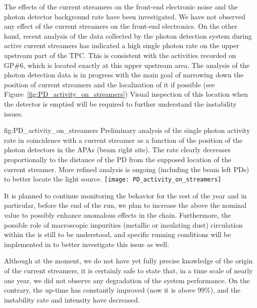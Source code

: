The effects of the current streamers on the front-end electronic noise and the photon detector background rate have been investigated. We have not observed any effect of the current streamers on the front-end electronics. On the other hand, recent analysis of the data collected by the photon detection system during active current streamers has indicated a high single photon rate on the upper upstream part of the TPC. This is consistent with the activities recorded on GP\#6, which is located exactly at this upper upstream area. The analysis of the photon detection data is in progress with the main goal of narrowing down the position of current streamers and the localization of it if possible (see Figure~\ref{fig:PD_activity_on_streamers})
Visual inspection of this location when the detector is emptied will be required to further understand the  instability issues.

\begin{dunefigure}
{fig:PD_activity_on_streamers}
{Preliminary analysis of the single photon activity rate in coincidence with a current streamer as a function of the position of the photon detectors in the APAs (beam right site). The rate clearly decreases proportionally to the distance of the PD from the supposed location of the current streamer. More refined analysis is ongoing (including the beam left PDs) to better locate the light source.}
\texttt{[image: PD\_activity\_on\_streamers]}
\end{dunefigure}



It is planned to continue monitoring the  behavior for the rest of the year and in particular, before the end of the run, we plan to increase the  above the nominal value to possibly enhance anomalous effects in the  chain. Furthermore, the possible role of macroscopic impurities (metallic or insulating dust) circulation within the  is still to be understood, and specific running conditions will be implemented in  to better investigate this issue as well. 

Although at the moment, we do not have yet fully precise knowledge of the origin of the current streamers, it is certainly safe to state that, in a time scale of nearly one year, we did not observe any degradation of the  system performance. On the contrary, the up-time has constantly improved (now it is above 99\%), and the instability rate and intensity have decreased. 




